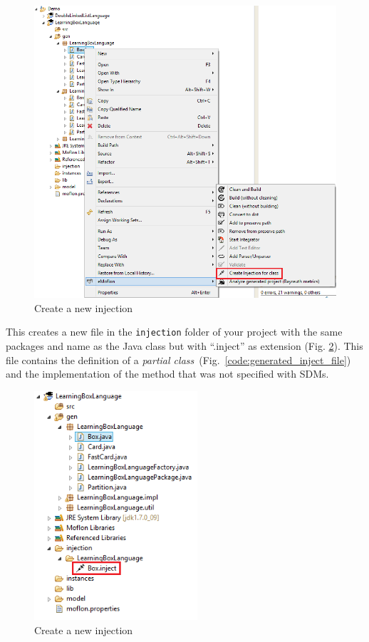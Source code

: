 \begin{enumerate}
    \begin{figure}[htbp]
        \centering
        \includegraphics[width=\textwidth]{pics/injectionBilder/create_injection_context_menu.png}
        \caption{Create a new injection}
        \label{fig:injection_create_injection}
    \end{figure}

    This creates a new file in the \texttt{injection} folder of your project with the same packages and name as the Java class but with ``.inject'' as extension (Fig. \ref{fig:injection_created_injection_file}). This file contains the definition of a \textit{partial class}~(Fig.~\ref{code:generated_inject_file}) and the implementation of the method that was not specified with SDMs.

    \begin{figure}[htbp]
        \centering
        \includegraphics[width=0.54\textwidth]{pics/injectionBilder/newly_created_injection_file.png}
        \caption{Create a new injection}
        \label{fig:injection_created_injection_file}
    \end{figure}
    \FloatBarrier


\end{enumerate}
